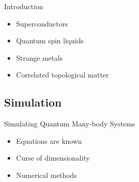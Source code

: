 \begin{frame}{Introduction}
\begin{itemize}
{\begin{itemize}
                      \item Superconductors
                      \item Quantum  spin  liquids
                      \item Strange metals
                      \item Correlated topological matter
                  \end{itemize}
              }
    \end{itemize}
\end{frame}

\subsection{Simulation}

\begin{frame}{Simulating Quantum Many-body Systems}
    \begin{itemize}
        \item Equations are known
        \item Curse of dimensionality
        \item Numerical methods
    \end{itemize}
\end{frame}

